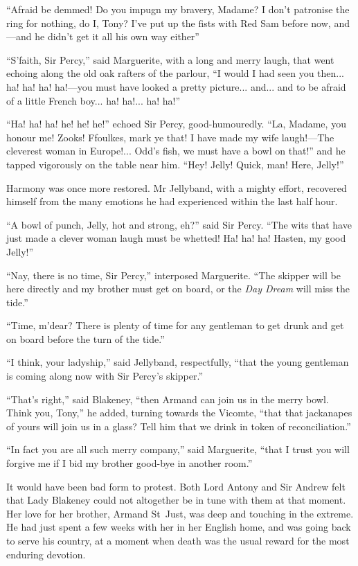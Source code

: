\enquote{Afraid be demmed! Do you impugn my bravery, Madame? I don't patronise the ring for nothing, do I, Tony? I've put up the fists with Red Sam before now, and---and he didn't get it all his own way either\longdash}

\enquote{S'faith, Sir Percy,} said Marguerite, with a long and merry laugh, that went echoing along the old oak rafters of the parlour, \enquote{I would I had seen you then... ha! ha! ha! ha!---you must have looked a pretty picture... and... and to be afraid of a little French boy... ha! ha!... ha! ha!}

\enquote{Ha! ha! ha! he! he! he!} echoed Sir Percy, good-humouredly. \enquote{La, Madame, you honour me! Zooks!  Ffoulkes, mark ye that! I have made my wife laugh!---The cleverest woman in Europe!... Odd's fish, we must have a bowl on that!} and he tapped vigorously on the table near him. \enquote{Hey! Jelly! Quick, man! Here, Jelly!}

Harmony was once more restored. Mr Jellyband, with a mighty effort, recovered himself from the many emotions he had experienced within the last half hour.

\enquote{A bowl of punch, Jelly, hot and strong, eh?} said Sir Percy. \enquote{The wits that have just made a clever woman laugh must be whetted! Ha! ha! ha! Hasten, my good Jelly!}

\enquote{Nay, there is no time, Sir Percy,} interposed Marguerite. \enquote{The skipper will be here directly and my brother must get on board, or the \textit{Day Dream} will miss the tide.}

\enquote{Time, m'dear? There is plenty of time for any gentleman to get drunk and get on board before the turn of the tide.}

\enquote{I think, your ladyship,} said Jellyband, respectfully, \enquote{that the young gentleman is coming along now with Sir Percy's skipper.}

\enquote{That's right,} said Blakeney, \enquote{then Armand can join us in the merry bowl. Think you, Tony,} he added, turning towards the Vicomte, \enquote{that that jackanapes of yours will join us in a glass? Tell him that we drink in token of reconciliation.}

\enquote{In fact you are all such merry company,} said Marguerite, \enquote{that I trust you will forgive me if I bid my brother good-bye in another room.}

It would have been bad form to protest. Both Lord Antony and Sir Andrew felt that Lady Blakeney could not altogether be in tune with them at that moment. Her love for her brother, Armand St~Just, was deep and touching in the extreme. He had just spent a few weeks with her in her English home, and was going back to serve his country, at a moment when death was the usual reward for the most enduring devotion.


